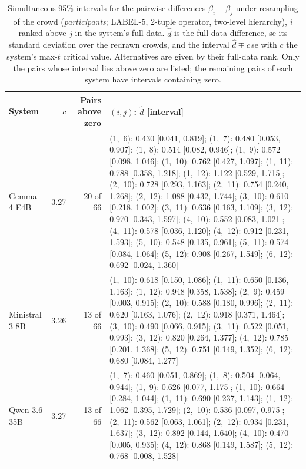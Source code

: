 \begin{table}[htbp]
\centering
\caption{Simultaneous 95\% intervals for the pairwise differences $\beta_i-\beta_j$ under resampling of the crowd (\emph{participants}; LABEL-5, 2-tuple operator, two-level hierarchy), $i$ ranked above $j$ in the system's full data. $\hat d$ is the full-data difference, se its standard deviation over the redrawn crowds, and the interval $\hat d \mp c\,$se with $c$ the system's max-$t$ critical value. Alternatives are given by their full-data rank. Only the pairs whose interval lies above zero are listed; the remaining pairs of each system have intervals containing zero.}
\label{tab:cdm_simultaneous_pairs}
\small
\begin{tabular}{lrrl}
\toprule
\textbf{System} & \textbf{$c$} & \textbf{Pairs above zero} & \textbf{$(i, j)$: $\hat d$ [interval]} \\
\midrule
  Gemma 4 E4B & 3.27 & 20 of 66 & \parbox[t]{0.56\textwidth}{(1,~6): 0.430 [0.041, 0.819]; (1,~7): 0.480 [0.053, 0.907]; (1,~8): 0.514 [0.082, 0.946]; (1,~9): 0.572 [0.098, 1.046]; (1,~10): 0.762 [0.427, 1.097]; (1,~11): 0.788 [0.358, 1.218]; (1,~12): 1.122 [0.529, 1.715]; (2,~10): 0.728 [0.293, 1.163]; (2,~11): 0.754 [0.240, 1.268]; (2,~12): 1.088 [0.432, 1.744]; (3,~10): 0.610 [0.218, 1.002]; (3,~11): 0.636 [0.163, 1.109]; (3,~12): 0.970 [0.343, 1.597]; (4,~10): 0.552 [0.083, 1.021]; (4,~11): 0.578 [0.036, 1.120]; (4,~12): 0.912 [0.231, 1.593]; (5,~10): 0.548 [0.135, 0.961]; (5,~11): 0.574 [0.084, 1.064]; (5,~12): 0.908 [0.267, 1.549]; (6,~12): 0.692 [0.024, 1.360]} \\
  Ministral 3 8B & 3.26 & 13 of 66 & \parbox[t]{0.56\textwidth}{(1,~10): 0.618 [0.150, 1.086]; (1,~11): 0.650 [0.136, 1.163]; (1,~12): 0.948 [0.358, 1.538]; (2,~9): 0.459 [0.003, 0.915]; (2,~10): 0.588 [0.180, 0.996]; (2,~11): 0.620 [0.163, 1.076]; (2,~12): 0.918 [0.371, 1.464]; (3,~10): 0.490 [0.066, 0.915]; (3,~11): 0.522 [0.051, 0.993]; (3,~12): 0.820 [0.264, 1.377]; (4,~12): 0.785 [0.201, 1.368]; (5,~12): 0.751 [0.149, 1.352]; (6,~12): 0.680 [0.084, 1.277]} \\
  Qwen 3.6 35B & 3.27 & 13 of 66 & \parbox[t]{0.56\textwidth}{(1,~7): 0.460 [0.051, 0.869]; (1,~8): 0.504 [0.064, 0.944]; (1,~9): 0.626 [0.077, 1.175]; (1,~10): 0.664 [0.284, 1.044]; (1,~11): 0.690 [0.237, 1.143]; (1,~12): 1.062 [0.395, 1.729]; (2,~10): 0.536 [0.097, 0.975]; (2,~11): 0.562 [0.063, 1.061]; (2,~12): 0.934 [0.231, 1.637]; (3,~12): 0.892 [0.144, 1.640]; (4,~10): 0.470 [0.005, 0.935]; (4,~12): 0.868 [0.149, 1.587]; (5,~12): 0.768 [0.008, 1.528]} \\

\end{tabular}
\end{table}
